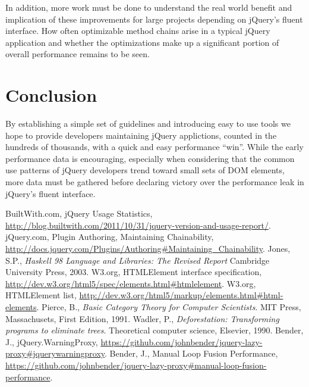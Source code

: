 \documentclass[preprint]{sigplanconf}
\begin{document}
In addition, more work must be done to understand the real world benefit and implication of these improvements for large projects depending on jQuery's fluent interface. How often optimizable method chains arise in a typical jQuery application and whether the optimizations make up a significant portion of overall performance remains to be seen.

\section{Conclusion}

By establishing a simple set of guidelines and introducing easy to use tools we hope to provide developers maintaining jQuery applictions, counted in the hundreds of thousands, with a quick and easy performance ``win''. While the early performance data is encouraging, especially when considering that the common use patterns of jQuery developers trend toward small sets of DOM elements, more data must be gathered before declaring victory over the performance leak in jQuery's fluent interface.




\begin{thebibliography}{}
\softraggedright

  BuiltWith.com,
  jQuery Usage Statistics,
  \url{http://blog.builtwith.com/2011/10/31/jquery-version-and-usage-report/}.
  jQuery.com,
  Plugin Authoring,
  Maintaining Chainability,
  \url{http://docs.jquery.com/Plugins/Authoring#Maintaining_Chainability}.
  Jones, S.P.,
  \emph{Haskell 98 Language and Libraries: The Revised Report}
  Cambridge University Press,
  2003.
  W3.org,
  HTMLElement interface specification,
  \url{http://dev.w3.org/html5/spec/elements.html#htmlelement}.
  W3.org,
  HTMLElement list,
  \url{http://dev.w3.org/html5/markup/elements.html#html-elements}.
  Pierce, B.,
  \emph{Basic Category Theory for Computer Scientists}.
  MIT Press, Massachusets,
  First Edition,
  1991.
  Wadler, P.,
  \emph{Deforestation: Transforming programs to eliminate trees}.
  Theoretical computer science,
  Elsevier,
  1990.
  Bender, J.,
  jQuery.WarningProxy,
  \url{https://github.com/johnbender/jquery-lazy-proxy#jquerywarningproxy}.
  Bender, J.,
  Manual Loop Fusion Performance,
  \url{https://github.com/johnbender/jquery-lazy-proxy#manual-loop-fusion-performance}.



\end{thebibliography}
\end{document}
